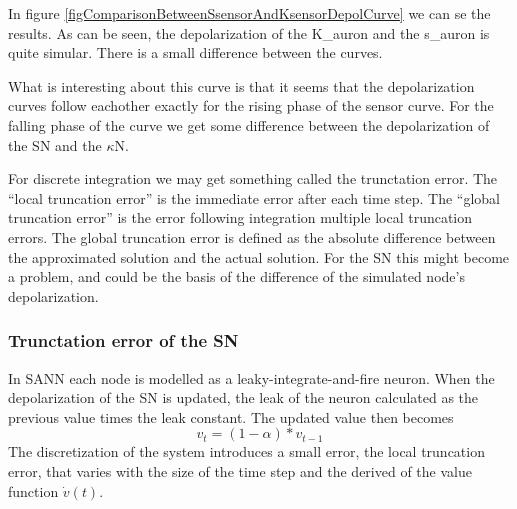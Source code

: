 In figure \ref{figComparisonBetweenSsensorAndKsensorDepolCurve} we can se the results. 
As can be seen, the depolarization of the K\_auron and the s\_auron is quite simular.
There is a small difference between the curves.

What is interesting about this curve is that it seems that the depolarization curves follow eachother exactly %
for the rising phase of the sensor curve. For the falling phase of the curve we get some difference between the depolarization of the SN and the $\kappa$N.

For discrete integration we may get something called the trunctation error. The ``local truncation error'' is the immediate error after each time step. 
The ``global truncation error'' is the error following integration multiple local truncation errors. %
The global truncation error is defined as the absolute difference between the approximated solution and the actual solution. 
For the SN this might become a problem, and could be the basis of the difference of the simulated node's depolarization.%


\subsubsection{Trunctation error of the SN} %
In SANN each node is modelled as a leaky-integrate-and-fire neuron.
When the depolarization of the SN is updated, the leak of the neuron calculated as the previous value times the leak constant.
The updated value then becomes %
\begin{equation} %
	v_t =  (1-\alpha) * v_{t-1}  
\end{equation}
The discretization of the system introduces a small error, the local truncation error, that varies with the size of the time step and the derived of the value function $\dot{v}(t)$. %

